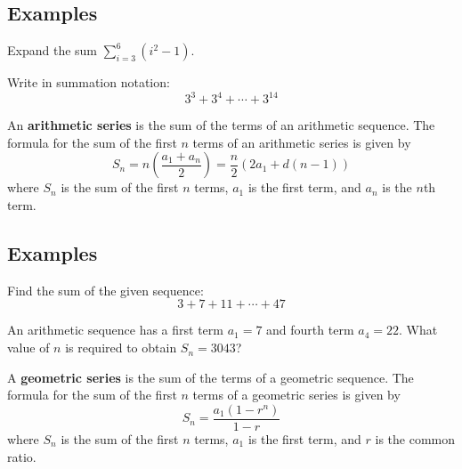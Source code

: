 \documentclass[addpoints]{exam}
\begin{document}
\subsection*{Examples}

\begin{questions}
    \begin{minipage}[t]{.45\linewidth}
        \question Expand the sum $\displaystyle\sum_{i=3}^6 (i^2-1)$.
    \end{minipage}
    \hfill
    \begin{minipage}[t]{.45\linewidth}
        \question Write in summation notation: \[3^3+3^4+\cdots+3^{14}\]
    \end{minipage}

\end{questions}


\begin{tcolorbox}[title=Definition: \textit{Arithmetic Series},title filled,colframe=black,sharpish corners,width=\linewidth]

An \textbf{arithmetic series} is the sum of the terms of an arithmetic sequence. The formula for the sum of the first $n$ terms of an arithmetic series is given by
\[S_n=n\left(\frac{a_1+a_n}{2}\right)=\frac{n}{2}\left(2a_1+d(n-1)\right)\]
where $S_n$ is the sum of the first $n$ terms, $a_1$ is the first term, and $a_n$ is the $n$th term.

\end{tcolorbox}

\subsection*{Examples}
\begin{questions}
    \question Find the sum of the given sequence: \[3+7+11+\cdots+47\]


    \newpage

    \question An arithmetic sequence has a first term $a_1=7$ and fourth term $a_4=22$. What value of $n$ is required to obtain $S_n=3043$?

\end{questions}

\begin{tcolorbox}[title=Definition: \textit{Geometric Series},title filled,colframe=black,sharpish corners,width=\linewidth]

A \textbf{geometric series} is the sum of the terms of a geometric sequence. The formula for the sum of the first $n$ terms of a geometric series is given by
\[S_n=\frac{a_1(1-r^n)}{1-r}\]
where $S_n$ is the sum of the first $n$ terms, $a_1$ is the first term, and $r$ is the common ratio.

\end{tcolorbox}
\end{document}
